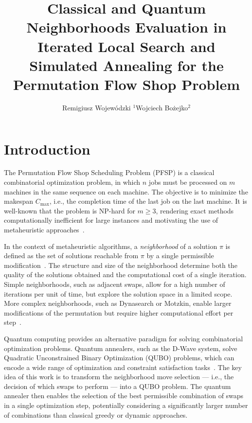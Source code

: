 \documentclass[10pt,twoside,twocolumn,a4paper]{article}
\title{Classical and Quantum Neighborhoods Evaluation in Iterated Local Search and Simulated Annealing for the Permutation Flow Shop Problem}
\author{Remigiusz Wojewódzki \email{remigiusz.wojewodzki@gmail.com} $^{1}$Wojciech Bożejko$^{2}$\email{wojciech.bozejko@pwr.edu.pl}}
\begin{document}
\maketitle


\section{Introduction}

The Permutation Flow Shop Scheduling Problem (PFSP) is a classical combinatorial optimization problem, in which $n$ jobs must be processed on $m$ machines in the same sequence on each machine. The objective is to minimize the makespan $C_{\max}$, i.e., the completion time of the last job on the last machine. It is well-known that the problem is NP-hard for $m \ge 3$, rendering exact methods computationally inefficient for large instances and motivating the use of metaheuristic approaches~\cite{ref_bozejko_parallel}.

In the context of metaheuristic algorithms, a \emph{neighborhood} of a solution $\pi$ is defined as the set of solutions reachable from $\pi$ by a single permissible modification~\cite{vanlaarhoven1992}. The structure and size of the neighborhood determine both the quality of the solutions obtained and the computational cost of a single iteration. Simple neighborhoods, such as adjacent swaps, allow for a high number of iterations per unit of time, but explore the solution space in a limited scope. More complex neighborhoods, such as Dynasearch or Motzkin, enable larger modifications of the permutation but require higher computational effort per step~\cite{WojewodzkiBozejko2026,Motzkin_PWR}.

Quantum computing provides an alternative paradigm for solving combinatorial optimization problems. Quantum annealers, such as the D-Wave system, solve Quadratic Unconstrained Binary Optimization (QUBO) problems, which can encode a wide range of optimization and constraint satisfaction tasks~\cite{dwave_handbook}. The key idea of this work is to transform the neighborhood move selection --- i.e., the decision of which swaps to perform --- into a QUBO problem. The quantum annealer then enables the selection of the best permissible combination of swaps in a single optimization step, potentially considering a significantly larger number of combinations than classical greedy or dynamic approaches.
\end{document}
